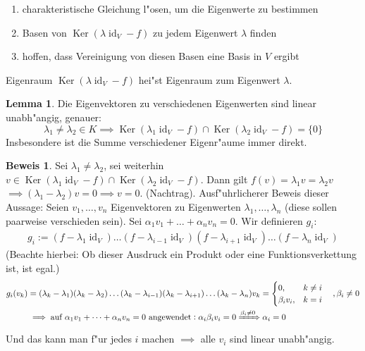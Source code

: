 \documentclass[oneside,fontsize=11pt,paper=a4,BCOR=0mm,DIV=12,automark,headsepline]{scrbook}
\DeclareMathOperator{\mKer}{Ker}
\DeclareMathOperator{\mId}{id}
\theoremstyle{remark}
\theoremstyle{definition}
\newtheorem{lemma}{Lemma}[section]
\theoremstyle{definition}
\newtheorem*{prof}{Beweis}
\theoremstyle{remark}
\begin{document}
\begin{enumerate}
\item charakteristische Gleichung l"osen, um die Eigenwerte zu bestimmen
\item Basen von \(\mKer(\lambda\mId_V-f)\) zu jedem Eigenwert \(\lambda\) finden
\item hoffen, dass Vereinigung von diesen Basen eine Basis in \(V\) ergibt
\end{enumerate}
\begin{definition}{Eigenraum}{}
  \(\mKer(\lambda\mId_V-f)\) hei"st Eigenraum zum Eigenwert \(\lambda\).
\end{definition}
\begin{lemma}
  Die Eigenvektoren zu verschiedenen Eigenwerten sind linear unabh"angig, genauer: \[\lambda_1\neq\lambda_2\in K\implies\mKer(\lambda_1\mId_V-f)\cap\mKer(\lambda_2\mId_V-f)=\{0\}\]
  Insbesondere ist die Summe verschiedener Eigenr"aume immer direkt.
\end{lemma}
\begin{prof}
  Sei \(\lambda_1\neq\lambda_2\), sei weiterhin \(v\in\mKer(\lambda_1\mId_V-f)\cap\mKer(\lambda_2\mId_V-f)\). Dann gilt \(f(v)=\lambda_1v=\lambda_2v\) \(\implies(\lambda_1-\lambda_2)v = 0\implies v = 0\).
(Nachtrag). Ausf"uhrlicherer Beweis dieser Aussage: Seien \(v_1,\dots,v_n\) Eigenvektoren zu Eigenwerten \(\lambda_1,\dots,\lambda_n\) (diese sollen paarweise verschieden sein). Sei \(\alpha_1 v_1+\dots + \alpha_nv_n = 0\). Wir definieren \(g_i\):
  \begin{align*}
    g_i := (f-\lambda_1\mId_V)\dots(f-\lambda_{i-1}\mId_V)(f-\lambda_{i+1}\mId_V)\dots(f-\lambda_n\mId_V)
  \end{align*}
  (Beachte hierbei: Ob dieser Ausdruck ein Produkt oder eine Funktionsverkettung ist, ist egal.)
  \begin{align*}
    g_i(v_k) &= (\lambda_k-\lambda_1)(\lambda_k-\lambda_2)\dots(\lambda_k-\lambda_{i-1})(\lambda_k-\lambda_{i+1})\dots(\lambda_k-\lambda_n)v_k =
               \begin{cases}
                 0, & k\neq i \\
                 \beta_iv_i, & k = i
               \end{cases} \quad ,\beta_i\neq 0 \\
    &\implies \text{auf }\alpha_1v_1+\dots +\alpha_nv_n = 0\text{ angewendet}: \alpha_i\beta_iv_i = 0 \xRightarrow{\beta_i \neq 0} \alpha_i = 0
  \end{align*}
  Und das kann man f"ur jedes \(i\) machen \(\implies\) alle \(v_i\) sind linear unabh"angig.
\end{prof}
\end{document}
